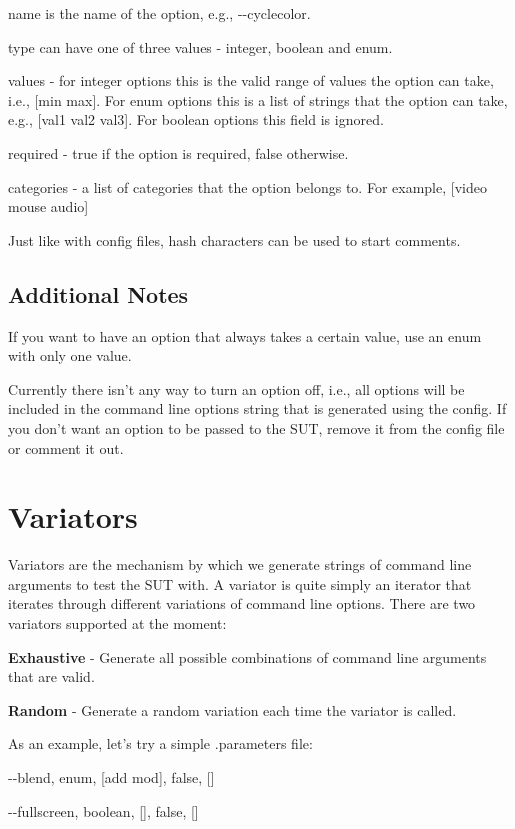 \begin{DoxyItemize}
\item {\ttfamily name} is the name of the option, e.\-g., {\ttfamily -\/-\/cyclecolor}. \item {\ttfamily type} can have one of three values -\/ integer, boolean and enum. \item {\ttfamily values} -\/ for integer options this is the valid range of values the option can take, i.\-e., \mbox{[}min max\mbox{]}. For enum options this is a list of strings that the option can take, e.\-g., \mbox{[}val1 val2 val3\mbox{]}. For boolean options this field is ignored. \item {\ttfamily required} -\/ true if the option is required, false otherwise. \item {\ttfamily categories} -\/ a list of categories that the option belongs to. For example, \mbox{[}video mouse audio\mbox{]}\end{DoxyItemize}
Just like with config files, hash characters can be used to start comments.\hypertarget{index_additionalnotes_subsec}{}\subsection{Additional Notes}\label{index_additionalnotes_subsec}
\begin{DoxyItemize}
\item If you want to have an option that always takes a certain value, use an enum with only one value. \item Currently there isn't any way to turn an option off, i.\-e., all options will be included in the command line options string that is generated using the config. If you don't want an option to be passed to the S\-U\-T, remove it from the config file or comment it out.\end{DoxyItemize}
\hypertarget{index_variators_sec}{}\section{Variators}\label{index_variators_sec}
Variators are the mechanism by which we generate strings of command line arguments to test the S\-U\-T with. A variator is quite simply an iterator that iterates through different variations of command line options. There are two variators supported at the moment\-: \begin{DoxyItemize}
\item {\bfseries Exhaustive} -\/ Generate all possible combinations of command line arguments that are valid. \item {\bfseries Random} -\/ Generate a random variation each time the variator is called.\end{DoxyItemize}
As an example, let's try a simple .parameters file\-:\par
 {\ttfamily  -\/-\/blend, enum, \mbox{[}add mod\mbox{]}, false, \mbox{[}\mbox{]} \par
 -\/-\/fullscreen, boolean, \mbox{[}\mbox{]}, false, \mbox{[}\mbox{]} }

